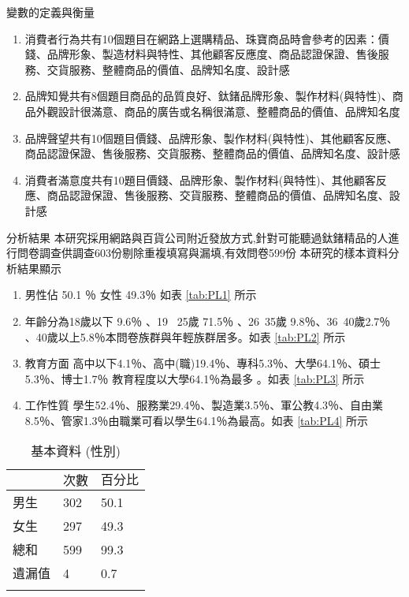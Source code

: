 變數的定義與衡量
\begin{enumerate}
\item  消費者行為共有10個題目在網路上選購精品、珠寶商品時會參考的因素：價錢、品牌形象、製造材料與特性、其他顧客反應度、商品認證保證、售後服務、交貨服務、整體商品的價值、品牌知名度、設計感
\item 品牌知覺共有8個題目商品的品質良好、鈦鍺品牌形象、製作材料(與特性)、商品外觀設計很滿意、商品的廣告或名稱很滿意、整體商品的價值、品牌知名度
\item 品牌聲望共有10個題目價錢、品牌形象、製作材料(與特性)、其他顧客反應、商品認證保證、售後服務、交貨服務、整體商品的價值、品牌知名度、設計感
\item 消費者滿意度共有10題目價錢、品牌形象、製作材料(與特性)、其他顧客反應、商品認證保證、售後服務、交貨服務、整體商品的價值、品牌知名度、設計感
\end{enumerate}
分析結果
本研究採用網路與百貨公司附近發放方式,針對可能聽過鈦鍺精品的人進行問卷調查供調查603份剔除重複填寫與漏填,有效問卷599份 
本研究的樣本資料分析結果顯示 
\begin{enumerate}
\item 男性佔 50.1 ％ 女性 49.3％ 如表 \ref{tab:PL1} 所示 
\item 年齡分為18歲以下 9.6％ 、19 ~25歲 71.5％ 、26~35歲 9.8％、36~40歲2.7％ 、40歲以上5.8％本問卷族群與年輕族群居多。如表  \ref{tab:PL2} 所示
\item 教育方面 高中以下4.1％、高中(職)19.4％、專科5.3％、大學64.1％、碩士5.3％、博士1.7％ 教育程度以大學64.1％為最多 。如表 \ref{tab:PL3} 所示
\item 工作性質 學生52.4％、服務業29.4％、製造業3.5％、軍公教4.3％、自由業8.5％、管家1.3％由職業可看以學生64.1％為最高。如表 \ref{tab:PL4} 所示
\end{enumerate}

\begin{table}[htb]
\caption{基本資料 (性別)}
\label{tab:PL1}
\renewcommand{\arraystretch}{1.2} %
\arrayrulewidth=1pt               %
\tabcolsep=60pt                   %
%
\begin{tabular}[t]{lll}  %
\hline
 & $次數$ & $百分比$ \\
\hline
男生        & 302 & 50.1 \\
女生        & 297  & 49.3 \\
總和        & 599  & 99.3 \\
遺漏值            & 4 & 0.7 \\
\hline
\centering
\label{fig:PL4}
\end{tabular}
\end{table}

